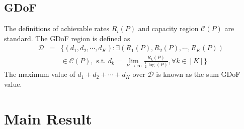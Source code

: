 \documentclass[11pt]{article}
\begin{document}
\subsection{GDoF}
The definitions of achievable rates $R_i(P)$ and capacity region $\mathcal{C}(P)$ are standard. The GDoF region is defined as
\begin{eqnarray}
\mathcal{D}&=&\{(d_1,d_2,\cdots,d_K): \exists (R_1(P),R_2(P), \cdots,R_K(P))\nonumber\\
&&\in\mathcal{C}(P), \mbox{ s.t. } d_k=\lim_{P\rightarrow\infty}\frac{R_k(P)}{\frac{1}{2}\log(P)}, \forall k\in[K]\}
\end{eqnarray}
The maximum value of $d_1+d_2+\cdots+d_K$ over $\mathcal{D}$ is known as the sum GDoF value.



\section{Main Result}
\end{document}

